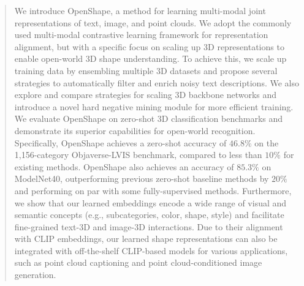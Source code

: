 \begin{abstract}
\vspace{-0.5em}
We introduce OpenShape, a method for learning multi-modal joint representations of text, image, and point clouds. We adopt the commonly used multi-modal contrastive learning framework for representation alignment, but with a specific focus on scaling up 3D representations to enable open-world 3D shape understanding. To achieve this, we scale up training data by ensembling multiple 3D datasets and propose several strategies to automatically filter and enrich noisy text descriptions. We also explore and compare strategies for scaling 3D backbone networks and introduce a novel hard negative mining module for more efficient training. We evaluate OpenShape on zero-shot 3D classification benchmarks and demonstrate its superior capabilities for open-world recognition. Specifically, OpenShape achieves a zero-shot accuracy of $46.8\%$ on the 1,156-category Objaverse-LVIS benchmark, compared to less than $10\%$ for existing methods. OpenShape also achieves an accuracy of $85.3\%$ on ModelNet40, outperforming previous zero-shot baseline methods by $20\%$ and performing on par with some fully-supervised methods. Furthermore, we show that our learned embeddings encode a wide range of visual and semantic concepts (e.g., subcategories, color, shape, style) and facilitate fine-grained text-3D and image-3D interactions. Due to their alignment with CLIP embeddings, our learned shape representations can also be integrated with off-the-shelf CLIP-based models for various applications, such as point cloud captioning and point cloud-conditioned image generation.
\end{abstract}



